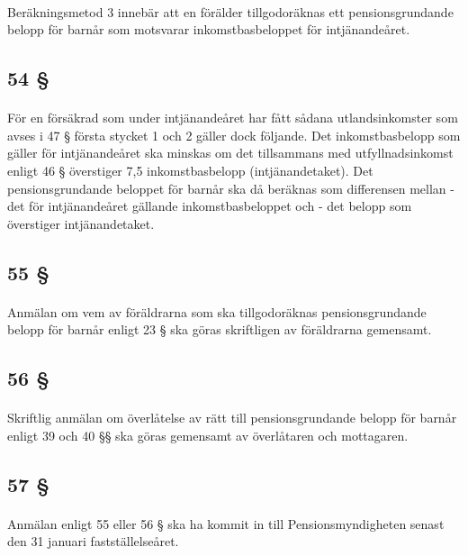 \documentclass[a4paper,notitlepage,openany,10pt]{book}
\begin{document}
\paragraph*{}
Beräkningsmetod 3 innebär att en förälder tillgodoräknas ett pensionsgrundande belopp för barnår som motsvarar inkomstbasbeloppet för intjänandeåret.
\subsection*{54 §}
\paragraph*{}
För en försäkrad som under intjänandeåret har fått sådana utlandsinkomster som avses i 47 § första stycket 1 och 2 gäller dock följande. Det inkomstbasbelopp som gäller för intjänandeåret ska minskas om det tillsammans med utfyllnadsinkomst enligt 46 § överstiger 7,5 inkomstbasbelopp (intjänandetaket). Det pensionsgrundande beloppet för barnår ska då beräknas som differensen mellan
\newline - det för intjänandeåret gällande inkomstbasbeloppet och
\newline - det belopp som överstiger intjänandetaket.
\subsection*{55 §}
\paragraph*{}
Anmälan om vem av föräldrarna som ska tillgodoräknas pensionsgrundande belopp för barnår enligt 23 § ska göras skriftligen av föräldrarna gemensamt.
\subsection*{56 §}
\paragraph*{}
Skriftlig anmälan om överlåtelse av rätt till pensionsgrundande belopp för barnår enligt 39 och 40 §§ ska göras gemensamt av överlåtaren och mottagaren.
\subsection*{57 §}
\paragraph*{}
Anmälan enligt 55 eller 56 § ska ha kommit in till Pensionsmyndigheten senast den 31 januari fastställelseåret.
\end{document}
